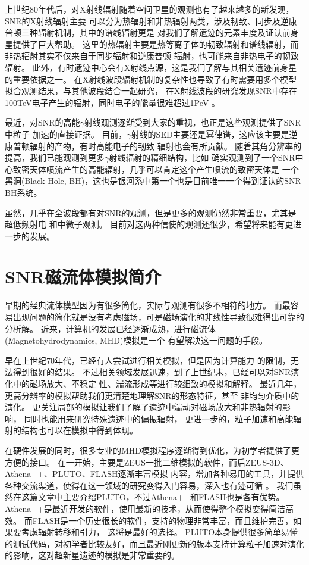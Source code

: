 上世纪80年代后，对X射线辐射随着空间卫星的观测也有了越来越多的新发现，SNR的X射线辐射主要
可以分为热辐射和非热辐射两类，涉及韧致、同步及逆康普顿三种辐射机制，其中的谱线辐射更是
对我们了解遗迹的元素丰度及证认前身星提供了巨大帮助。
这里的热辐射主要是热等离子体的韧致辐射和谱线辐射，而非热辐射其实不仅来自于同步辐射和逆康普顿
辐射，也可能来自非热电子的韧致辐射。
此外，有时遗迹中心会有X射线点源，这是我们了解与其相关遗迹前身星的重要依据之一。
在X射线波段辐射机制的复杂性也导致了有时需要用多个模型拟合观测结果，与其他波段结合一起研究，
在X射线波段的研究发现SNR中存在100TeV电子产生的辐射，同时电子的能量很难超过1PeV
\citep{Reynolds1999}。

最近，对SNR的高能$\gamma$射线观测逐渐受到大家的重视，也正是这些观测提供了SNR中粒子
加速的直接证据。
目前，$\gamma$射线的SED主要还是幂律谱，这应该主要是逆康普顿辐射的产物，有时高能电子的韧致
辐射也会有所贡献。
随着其角分辨率的提高，我们已能观测到更多$\gamma$射线辐射的精细结构，比如\citet{Abeysekara2018}
确实观测到了一个SNR中心致密天体喷流产生的高能辐射，几乎可以肯定这个产生喷流的致密天体是
一个黑洞(Black Hole, BH)，这也是银河系中第一个也是目前唯一一个得到证认的SNR-BH系统。

虽然，几乎在全波段都有对SNR的观测，但是更多的观测仍然非常重要，尤其是超低频射电
和中微子观测。
目前对这两种信使的观测还很少，希望将来能有更进一步的发展。

\section{SNR磁流体模拟简介}
\label{MHDintro}
早期的经典流体模型因为有很多简化，实际与观测有很多不相符的地方。
而最容易出现问题的简化就是没有考虑磁场，可是磁场演化的非线性导致很难得出可靠的分析解。
近来，计算机的发展已经逐渐成熟，进行磁流体(Magnetohydrodynamics, MHD)模拟是一个
有望解决这一问题的手段。

早在上世纪70年代，已经有人尝试进行相关模拟\citep{1978MmSAI..49..513S}，但是因为计算能力
的限制，无法得到很好的结果。
不过相关领域发展迅速，到了上世纪末，已经可以对SNR演化中的磁场放大、不稳定
性、湍流形成等进行较细致的模拟和解释\citep{Jun1996, Jun1996a, Jun1999}。
最近几年，更高分辨率的模拟帮助我们更清楚地理解SNR的形态特征\citep{Orlando2007}，甚至
非均匀介质中的演化\citep{Ferreira2008}。
更关注局部的模拟让我们了解了遗迹中湍动对磁场放大和非热辐射的影响\citep{Fang2014, Ji2016b}，
同时也能用来研究特殊遗迹中的偏振辐射\citep{Schneiter2015, Velazquez2017}，
更进一步的，粒子加速和高能辐射的结构也可以在模拟中得到体现\citep{Yang2015, vanMarle2018}。

在硬件发展的同时，很多专业的MHD模拟程序逐渐得到优化，为初学者提供了更方便的接口。
在一开始，主要是ZEUS一批二维模拟的软件，而后ZEUS-3D、Athena++、PLUTO、FLASH逐渐丰富模拟
内容，增加各种易用的工具，并提供各种交流渠道，使得在这一领域的研究变得入门容易，深入也有迹可循
\citep{Stone1992b, Stone1992, Stone1992a, White2016, Mignone2007, Mignone2012, Fryxell2000}。
我们虽然在这篇文章中主要介绍PLUTO，不过Athena++和FLASH也是各有优势。
Athena++是最近开发的软件，使用最新的技术，从而使得整个模拟变得简洁高效。
而FLASH是一个历史很长的软件，支持的物理非常丰富，而且维护完善，如果要考虑辐射转移和引力，
这将是最好的选择。
PLUTO本身提供很多简单易懂的测试代码，对初学者比较友好，而且最近刚更新的版本支持计算粒子加速对演化
的影响，这对超新星遗迹的模拟是非常重要的。

